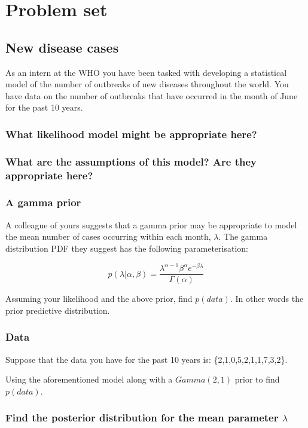 \documentclass[11pt,fullpage]{book}
\begin{document}
\section{Problem set}
\subsection{New disease cases}
As an intern at the WHO you have been tasked with developing a statistical model of the number of outbreaks of new diseases throughout the world. You have data on the number of outbreaks that have occurred in the month of June for the past 10 years.

\subsubsection{What likelihood model might be appropriate here?}
\subsubsection{What are the assumptions of this model? Are they appropriate here?}
\subsubsection{A gamma prior}
A colleague of yours suggests that a gamma prior may be appropriate to model the mean number of cases occurring within each month, $\lambda$. The gamma distribution PDF they suggest has the following parameterisation:

\begin{equation}
p(\lambda|\alpha,\beta) = \frac{\lambda^{\alpha-1}\beta^\alpha e^{-\beta\lambda}}{\Gamma(\alpha)}
\end{equation}

Assuming your likelihood and the above prior, find $p(data)$. In other words the prior predictive distribution.

\subsubsection{Data}
Suppose that the data you have for the past 10 years is: \{2,1,0,5,2,1,1,7,3,2\}.

Using the aforementioned model along with a $Gamma(2,1)$ prior to find $p(data)$. 

\subsubsection{Find the posterior distribution for the mean parameter $\lambda$}
\end{document}
